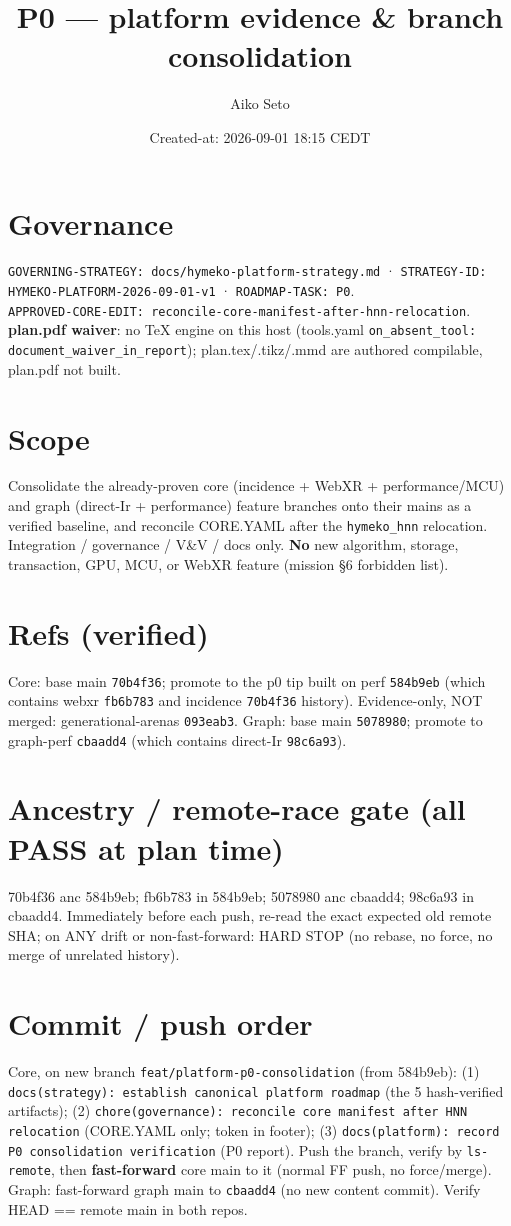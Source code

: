 \documentclass[11pt]{article}
\title{P0 --- platform evidence \& branch consolidation}\author{Aiko Seto}
\date{Created-at: 2026-09-01 18:15 CEDT}
\begin{document}
\maketitle
\section*{Governance}
\texttt{GOVERNING-STRATEGY: docs/hymeko-platform-strategy.md} · \texttt{STRATEGY-ID:
HYMEKO-PLATFORM-2026-09-01-v1} · \texttt{ROADMAP-TASK: P0}. \\
\texttt{APPROVED-CORE-EDIT: reconcile-core-manifest-after-hnn-relocation}.
\textbf{plan.pdf waiver}: no TeX engine on this host (tools.yaml \texttt{on\_absent\_tool:
document\_waiver\_in\_report}); plan.tex/.tikz/.mmd are authored compilable, plan.pdf not built.
\section*{Scope}
Consolidate the already-proven core (incidence + WebXR + performance/MCU) and graph (direct-Ir +
performance) feature branches onto their mains as a verified baseline, and reconcile CORE.YAML after the
\texttt{hymeko\_hnn} relocation. Integration / governance / V\&V / docs only. \textbf{No} new algorithm,
storage, transaction, GPU, MCU, or WebXR feature (mission §6 forbidden list).
\section*{Refs (verified)}
Core: base main \texttt{70b4f36}; promote to the p0 tip built on perf \texttt{584b9eb}
(which contains webxr \texttt{fb6b783} and incidence \texttt{70b4f36} history). Evidence-only, NOT merged:
generational-arenas \texttt{093eab3}. Graph: base main \texttt{5078980}; promote to graph-perf
\texttt{cbaadd4} (which contains direct-Ir \texttt{98c6a93}).
\section*{Ancestry / remote-race gate (all PASS at plan time)}
70b4f36 anc 584b9eb; fb6b783 in 584b9eb; 5078980 anc cbaadd4; 98c6a93 in cbaadd4. Immediately before each
push, re-read the exact expected old remote SHA; on ANY drift or non-fast-forward: HARD STOP (no rebase,
no force, no merge of unrelated history).
\section*{Commit / push order}
Core, on new branch \texttt{feat/platform-p0-consolidation} (from 584b9eb):
(1) \texttt{docs(strategy): establish canonical platform roadmap} (the 5 hash-verified artifacts);
(2) \texttt{chore(governance): reconcile core manifest after HNN relocation} (CORE.YAML only; token in
footer); (3) \texttt{docs(platform): record P0 consolidation verification} (P0 report). Push the branch,
verify by \texttt{ls-remote}, then \textbf{fast-forward} core main to it (normal FF push, no force/merge).
Graph: fast-forward graph main to \texttt{cbaadd4} (no new content commit). Verify HEAD == remote main in
both repos.
\end{document}
